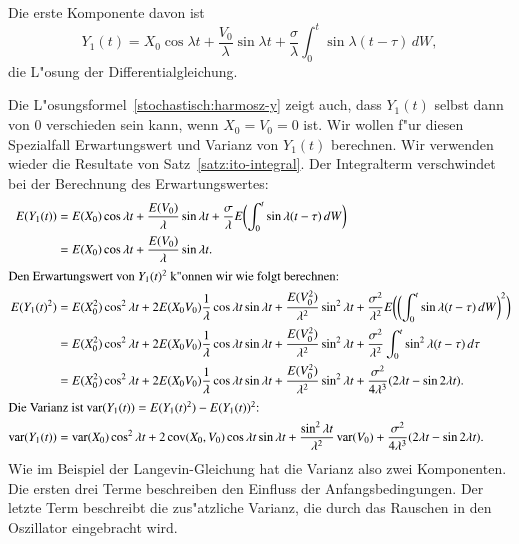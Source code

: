 Die erste Komponente davon ist
\begin{equation}
Y_1(t)
=
X_0\cos\lambda t+\frac{V_0}{\lambda}\sin\lambda t
+
\frac{\sigma}{\lambda}\int_0^t\sin\lambda(t-\tau)\,dW,
\label{stochastisch:harmosz-y}
\end{equation}
die L"osung der Differentialgleichung.

Die L"osungsformel~\eqref{stochastisch:harmosz-y} zeigt auch, dass
$Y_1(t)$ selbst dann von $0$ verschieden sein kann, wenn $X_0=V_0=0$ ist.
Wir wollen f"ur diesen Spezialfall Erwartungswert und Varianz 
von $Y_1(t)$ berechnen.
Wir verwenden wieder die Resultate von Satz~\ref{satz:ito-integral}.
Der Integralterm verschwindet bei der Berechnung des Erwartungswertes:
\begin{align*}
E(Y_1(t))
&=
E(X_0)\cos\lambda t
+
\frac{E(V_0)}{\lambda}\sin\lambda t
+
\frac{\sigma}{\lambda}E\biggl(\int_0^t\sin\lambda(t-\tau)\,dW\biggr)
\\
&=
E(X_0)\cos\lambda t+\frac{E(V_0)}{\lambda}\sin\lambda t.
\\
\intertext{Den Erwartungswert von $Y_1(t)^2$ k"onnen wir wie folgt berechnen:}
E(Y_1(t)^2)
&=
E(X_0^2)\cos^2\lambda t
+
2E(X_0V_0)\frac1{\lambda}\cos\lambda t\sin\lambda t
+
\frac{E(V_0^2)}{\lambda^2}\sin^2\lambda t
+
\frac{\sigma^2}{\lambda^2}E\biggl(
\biggl(\int_0^t\sin\lambda(t-\tau)\,dW\biggr)^2
\biggr)
\\
&=
E(X_0^2)\cos^2\lambda t
+
2E(X_0V_0)\frac1{\lambda}\cos\lambda t\sin\lambda t
+
\frac{E(V_0^2)}{\lambda^2}\sin^2\lambda t
+
\frac{\sigma^2}{\lambda^2}\int_0^t \sin^2\lambda(t-\tau)\,d\tau
\\
&=
E(X_0^2)\cos^2\lambda t
+
2E(X_0V_0)\frac1{\lambda}\cos\lambda t\sin\lambda t
+
\frac{E(V_0^2)}{\lambda^2}\sin^2\lambda t
+
\frac{\sigma^2}{4\lambda^3}
(2\lambda t -\sin 2\lambda t).
\\
\intertext{Die Varianz ist
$\operatorname{var}(Y_1(t))=E(Y_1(t)^2)-E(Y_1(t))^2$:}
\operatorname{var}(Y_1(t))
&=
\operatorname{var}(X_0)\cos^2\lambda t
+2\operatorname{cov}(X_0,V_0)\cos\lambda t\sin\lambda t
+
\frac{\sin^2\lambda t}{\lambda^2}\operatorname{var}(V_0)
+\frac{\sigma^2}{4\lambda^3}(2\lambda t-\sin2\lambda t).
\end{align*}
Wie im Beispiel der Langevin-Gleichung hat die Varianz
also zwei Komponenten.
Die ersten drei Terme beschreiben den Einfluss der Anfangsbedingungen.
Der letzte Term beschreibt die zus"atzliche Varianz, die durch
das Rauschen in den Oszillator eingebracht wird.

